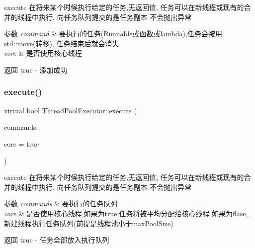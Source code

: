 execute 在将来某个时候执行给定的任务,无返回值, 任务可以在新线程或现有的合并的线程中执行, 向任务队列提交的是任务副本 不会抛出异常 


\begin{DoxyParams}{参数}
{\em command} & 要执行的任务(Runnable或函数或lambda),任务会被用std\+::move(转移), 任务结束后就会消失 \\
\hline
{\em core} & 是否使用核心线程\\
\hline
\end{DoxyParams}
\begin{DoxyReturn}{返回}
true -\/ 添加成功 
\end{DoxyReturn}
\mbox{\label{classThreadPoolExecutor_a451bba3f90dbed2ba7e491ebc391b3c6}} 
\subsubsection{\texorpdfstring{execute()}{execute()}\hspace{0.1cm}{\footnotesize\ttfamily [3/3]}}
{\footnotesize\ttfamily virtual bool Thread\+Pool\+Executor\+::execute (\begin{DoxyParamCaption}\item[{\hyperlink{classBlockingQueue}{Blocking\+Queue}$<$ \hyperlink{classRunnable_abe8d3066c7305401d6f0aad8e70780f2}{Runnable\+::sptr} $>$ \&}]{commands,  }\item[{bool}]{core = {\ttfamily true} }\end{DoxyParamCaption})\hspace{0.3cm}{\ttfamily [virtual]}}



execute 在将来某个时候执行给定的任务,无返回值, 任务可以在新线程或现有的合并的线程中执行, 向任务队列提交的是任务副本 不会抛出异常 


\begin{DoxyParams}{参数}
{\em commands} & 要执行的任务队列 \\
\hline
{\em core} & 是否使用核心线程,如果为true,任务将被平均分配给核心线程 如果为flase,新建线程执行任务队列(前提是线程池小于max\+Pool\+Size)\\
\hline
\end{DoxyParams}
\begin{DoxyReturn}{返回}
true -\/ 任务全部放入执行队列 
\end{DoxyReturn}
\mbox{\label{classThreadPoolExecutor_ac9345329aa167200bec31951d2f5a690}} 
